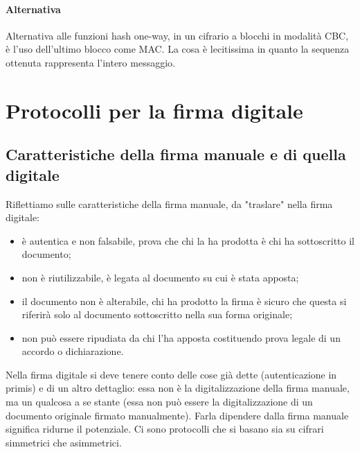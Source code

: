 \paragraph{Alternativa} Alternativa alle funzioni hash one-way, in un cifrario a blocchi in modalità CBC, è l'uso dell'ultimo blocco come MAC. La cosa è lecitissima in quanto la sequenza ottenuta rappresenta l'intero messaggio.

\section{Protocolli per la firma digitale}
\subsection{Caratteristiche della firma manuale e di quella digitale}
Riflettiamo sulle caratteristiche della firma manuale, da "traslare" nella firma digitale:
\begin{itemize}
    \item è autentica e non falsabile, prova che chi la ha prodotta è chi ha sottoscritto il documento;
    \item non è riutilizzabile, è legata al documento su cui è stata apposta;
    \item il documento non è alterabile, chi ha prodotto la firma è sicuro che questa si riferirà solo al documento sottoscritto nella sua forma originale;
    \item non può essere ripudiata da chi l'ha apposta costituendo prova legale di un accordo o dichiarazione.
\end{itemize}
Nella firma digitale si deve tenere conto delle cose già dette (autenticazione in primis) e di un altro dettaglio: essa non è la digitalizzazione della firma manuale, ma un qualcosa a se stante (essa non può essere la digitalizzazione di un documento originale firmato manualmente). Farla dipendere dalla firma manuale significa ridurne il potenziale. Ci sono protocolli che si basano sia su cifrari simmetrici che asimmetrici.

